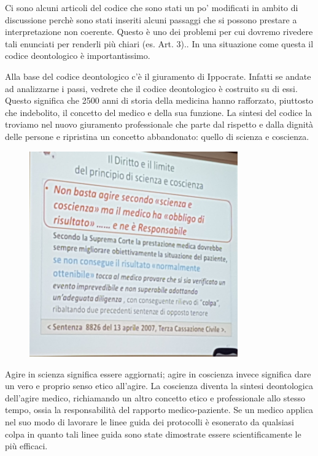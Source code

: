 Ci sono alcuni articoli del codice che sono stati un po' modificati in
ambito di discussione perchè sono stati inseriti alcuni passaggi che si
possono prestare a interpretazione non coerente. Questo è uno dei
problemi per cui dovremo rivedere tali enunciati per renderli più chiari
(es. Art. 3).. In una situazione come questa il codice deontologico è
importantissimo.

Alla base del codice deontologico c'è il giuramento di Ippocrate.
Infatti se andate ad analizzarne i passi, vedrete che il codice
deontologico è costruito su di essi. Questo significa che 2500 anni di
storia della medicina hanno rafforzato, piuttosto che indebolito, il
concetto del medico e della sua funzione. La sintesi del codice la
troviamo nel nuovo giuramento professionale che parte dal rispetto e
dalla dignità delle persone e ripristina un concetto abbandonato: quello
di scienza e coscienza.

\begin{figure}[!ht]
\centering
	\includegraphics[width=0.8\textwidth]{29/image1.jpeg}
	\end{figure}

Agire in scienza significa essere aggiornati; agire in coscienza invece
significa dare un vero e proprio senso etico all'agire. La coscienza
diventa la sintesi deontologica dell'agire medico, richiamando un altro
concetto etico e professionale allo stesso tempo, ossia la
responsabilità del rapporto medico-paziente. Se un medico applica nel
suo modo di lavorare le linee guida dei protocolli è esonerato da
qualsiasi colpa in quanto tali linee guida sono state dimostrate essere
scientificamente le più efficaci.

